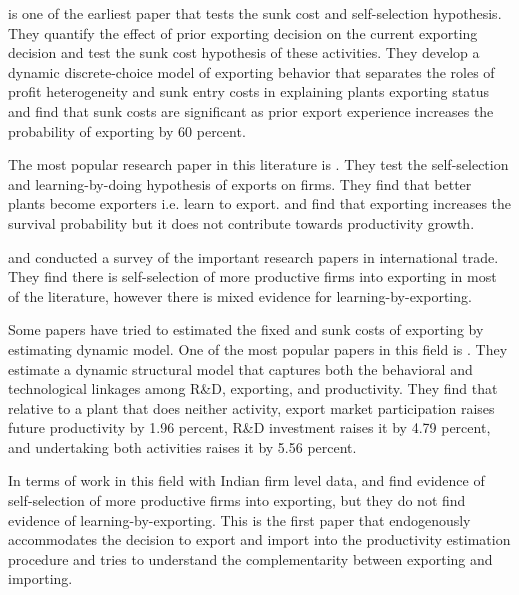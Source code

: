 \documentclass[12pt]{article}
\begin{document}
\textcite{roberts1997decision} is one of the earliest paper that
tests the sunk cost and self-selection hypothesis. They quantify the effect of prior exporting
decision on the current exporting decision and test the sunk cost
hypothesis of these activities.  They  develop a dynamic
discrete-choice 
model of exporting behavior that separates the roles of profit heterogeneity
 and sunk entry costs in explaining plants exporting status and find
 that sunk costs are significant as prior export experience increases
 the probability of exporting by 60 percent.  

The most popular research paper in this literature is
\textcite{bernard1999exceptional}. They test the self-selection and
 learning-by-doing hypothesis of exports on firms. They find that better
 plants become exporters i.e. learn to export. and find that exporting
 increases the survival probability but it does not contribute towards
 productivity growth.  

\textcite{wagner2007exports} and \textcite{wagner2012international}
conducted a survey of the important research papers in international
trade. They find  there is self-selection of more productive
firms into exporting in most of the literature, however there is mixed evidence for
learning-by-exporting.  


Some papers have tried to estimated the fixed and sunk costs of
exporting by estimating dynamic model. One of the most popular papers
in this field is \textcite{aw2011}. They estimate a dynamic structural model that captures both the behavioral
and technological linkages among R\&D, exporting, and
productivity. They find that relative to a
plant that does neither activity, export market participation raises future productivity
by 1.96 percent, R\&D investment raises it by 4.79 percent, and undertaking both
activities raises it by 5.56 percent. 

In terms of work in this field with Indian firm level data,
\textcite{haidar2012trade} and \textcite{gupta2018exporting} find evidence of
self-selection of more productive firms into exporting, but they do
not find evidence of learning-by-exporting. This is the first
paper that endogenously accommodates the decision to export and import
into the productivity estimation procedure and tries to understand the
complementarity between exporting and importing. 

\end{document}
